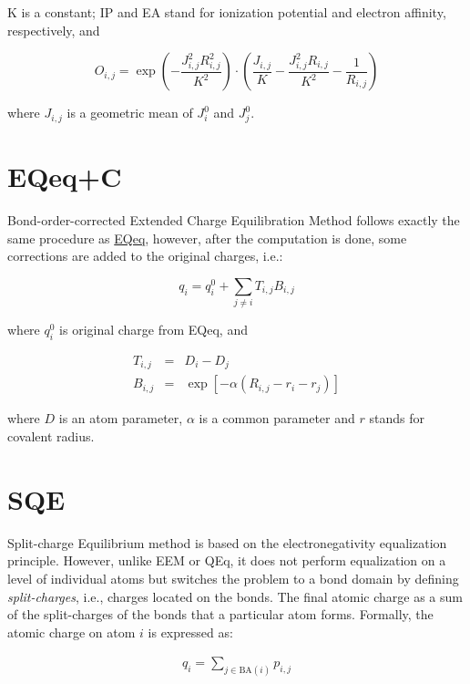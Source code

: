 \documentclass[oneside]{memoir}
\newcommand\ddfrac[2]{\frac{\displaystyle #1}{\displaystyle #2}}
\begin{document}
K is a constant; IP and EA stand for ionization potential and electron affinity, respectively, and

\begin{equation}
\label{eq:eqeq_overlap}
O_{i, j} = \exp{\left(-\ddfrac{J_{i, j}^2R_{i, j}^2}{K^2}\right)}\cdot\left(\ddfrac{J_{i, j}}{K} - \ddfrac{J_{i, j}^2R_{i, j}}{K^2} - \ddfrac{1}{R_{i, j}}\right)
\end{equation}

where $J_{i, j}$ is a geometric mean of $J_i^0$ and $J_j^0$.

\section*{EQeq+C}
Bond-order-corrected Extended Charge Equilibration Method \cite{MartinNoble2015} follows exactly the same procedure as \hyperref[sec:methods_eqeq]{EQeq}, however, after the computation is done, some corrections are added to the original charges, i.e.:

\begin{equation}
\label{eq:eqeqc_main}
q_i = q_i^0 + \sum_{j \neq i} T_{i, j}B_{i, j}
\end{equation}

where $q_i^0$ is original charge from EQeq, and

\begin{eqnarray}
\label{eq:eqeqc_terms}
T_{i, j} &=& D_i - D_j\\
B_{i, j} &=& \exp\left[-\alpha\left(R_{i, j} - r_i - r_j\right)\right]
\end{eqnarray}

where $D$ is an atom parameter, $\alpha$ is a common parameter and $r$ stands for covalent radius.

\section*{SQE}


Split-charge Equilibrium method \cite{Nistor2006} is based on the electronegativity equalization principle. However, unlike EEM or QEq, it does not perform equalization on a level of individual atoms but switches the problem to a bond domain by defining \textit{split-charges}, i.e., charges located on the bonds. The final atomic charge as a sum of the split-charges of the bonds that a particular atom forms. Formally, the atomic charge on atom $i$ is expressed as:

\begin{gather}
    \label{eq:sqe_sum}
    q_i = \sum_{j \in \mathrm{BA}(i)} p_{i, j}
\end{gather}
\end{document}
